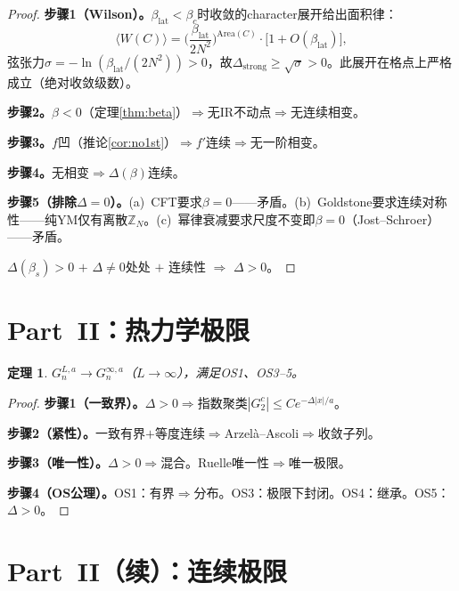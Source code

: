 \documentclass[12pt,a4paper]{article}
\theoremstyle{plain}
\newtheorem{theorem}{定理}[section]
\theoremstyle{definition}
\theoremstyle{remark}
\begin{document}
\begin{proof}
\textbf{步骤1（Wilson\cite{Wilson1974}）。}$\beta_{\mathrm{lat}}<\beta_c$时收敛的character展开给出面积律：
\begin{equation}
\langle W(C)\rangle = \bigg(\frac{\beta_{\mathrm{lat}}}{2N^2}\bigg)^{\!\mathrm{Area}(C)}\!\cdot\big[1+O(\beta_{\mathrm{lat}})\big],
\end{equation}
弦张力$\sigma=-\ln(\beta_{\mathrm{lat}}/(2N^2))>0$，故$\Delta_{\mathrm{strong}}\geq\sqrt{\sigma}>0$。此展开在格点上严格成立（绝对收敛级数）。

\textbf{步骤2。}$\beta<0$（定理\ref{thm:beta}）$\Rightarrow$无IR不动点$\Rightarrow$无连续相变。

\textbf{步骤3。}$f$凹（推论\ref{cor:no1st}）$\Rightarrow f'$连续$\Rightarrow$无一阶相变。

\textbf{步骤4。}无相变$\Rightarrow\Delta(\beta)$连续。

\textbf{步骤5（排除$\Delta=0$）。}(a)~CFT要求$\beta=0$——矛盾。(b)~Goldstone要求连续对称性——纯YM仅有离散$\mathbb{Z}_N$。(c)~幂律衰减要求尺度不变即$\beta=0$（Jost--Schroer\cite{Jost1965,Schroer1963}）——矛盾。

$\Delta(\beta_s)>0$ $+$ $\Delta\neq 0$处处 $+$ 连续性 $\Rightarrow$ $\Delta>0$。
\end{proof}

\section{Part~II：热力学极限}\label{sec:thermo}

\begin{theorem}\label{thm:thermo}
$G_n^{L,a}\to G_n^{\infty,a}$（$L\to\infty$），满足OS1、OS3--5。
\end{theorem}

\begin{proof}
\textbf{步骤1（一致界）。}$\Delta>0\Rightarrow$指数聚类$|G_2^c|\leq Ce^{-\Delta|x|/a}$。

\textbf{步骤2（紧性）。}一致有界$+$等度连续$\Rightarrow$Arzel\`a--Ascoli$\Rightarrow$收敛子列。

\textbf{步骤3（唯一性）。}$\Delta>0\Rightarrow$混合。Ruelle唯一性\cite{Ruelle1969}$\Rightarrow$唯一极限。

\textbf{步骤4（OS公理）。}OS1：有界$\Rightarrow$分布。OS3：极限下封闭\cite{OsterwalderSeiler1978}。OS4：继承。OS5：$\Delta>0$。
\end{proof}

\section{Part~II（续）：连续极限}\label{sec:contlim}
\end{document}
